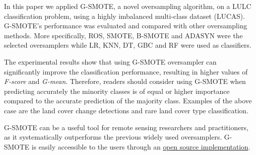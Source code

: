 \documentclass[remotesensing,article,submit,moreauthors,pdftex]{Definitions/mdpi}
\begin{document}
In this paper we applied G-SMOTE, a novel oversampling algorithm, on a LULC
classification problem, using a highly imbalanced multi-class dataset (LUCAS).
G-SMOTE's performance was evaluated and compared with other oversampling
methods. More specifically, ROS, SMOTE, B-SMOTE and ADASYN were the selected
oversamplers while LR, KNN, DT, GBC and RF were used as classifiers.

The experimental results show that using G-SMOTE oversampler can significantly 
improve the classification performance, resulting in higher values of 
\textit{F-score} and \textit{G-mean}. Therefore, readers should consider using G-SMOTE when 
predicting accurately the minority classes is of equal or higher importance compared to 
the accurate prediction of the majority class. Examples of the above case are the 
land cover change detections and rare land cover type classification.

G-SMOTE can be a useful tool for remote sensing researchers and practitioners,
as it systematically outperforms the previous widely used oversamplers. 
G-SMOTE is easily accessible to the users through an
\href{https://geometric-smote.readthedocs.io/en/latest/?badge=latest}{open
	source implementation}.

\vspace{6pt}




\end{document}
